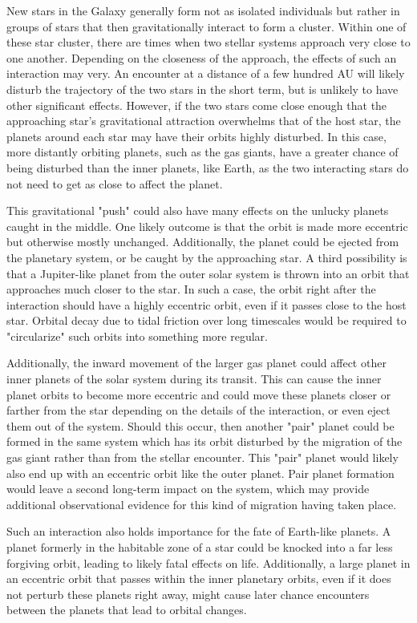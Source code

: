 \documentclass[12pt]{article}
\begin{document}
New stars in the Galaxy generally form not as isolated individuals but rather in groups of stars
that then gravitationally interact to form a cluster.
Within one of these star cluster, there are times when two stellar systems approach very close
to one another. Depending on the closeness of the approach, the effects of such
an interaction may very. An encounter at a distance of a few hundred AU will likely disturb the trajectory
of the two stars in the short term, but is unlikely to have other significant effects. However,
if the two stars come close enough that the approaching star's gravitational attraction
overwhelms that of the host star, the planets around each star may have their orbits
highly disturbed. In this case, more distantly orbiting planets, such as the gas giants,
have a greater chance of being disturbed than the inner planets, like Earth, as the two 
interacting stars do not need to get as close to affect the planet.

This gravitational "push" could also have many effects on the unlucky planets caught in the
middle. One likely outcome is that the orbit is made more eccentric but otherwise
mostly unchanged. Additionally, the planet could be ejected from the planetary system,
or be caught by the approaching star. A third possibility is that a Jupiter-like planet
from the outer solar system is thrown into an orbit that approaches much closer to the
star. In such a case, the orbit right after the interaction should have a highly
eccentric orbit, even if it passes close to the host star. Orbital decay due to tidal
friction over long
timescales would be required to "circularize" such orbits into something more regular.

Additionally, the inward movement of the larger gas planet could affect other
inner planets of the solar system during its transit. This can
cause the inner planet orbits to become more eccentric and could move
these planets closer or farther from the star depending on the details of the
interaction, or even eject them out of the system. Should this occur,
then another "pair" planet could be formed in the same system which has its orbit
disturbed by the migration of the gas giant rather than from the stellar encounter. 
This "pair" planet 
would likely also end up with an eccentric orbit like the outer planet. Pair planet formation would leave
a second long-term impact on the system, which may provide additional observational
evidence for this kind of migration having taken place.

Such an interaction also holds importance for the fate of Earth-like planets.
A planet formerly in the habitable zone of a star could be knocked into a far less
forgiving orbit, leading to likely fatal effects on life. Additionally, a
large planet in an eccentric orbit that passes within the inner planetary orbits,
even if it does not perturb these planets right away, might cause later chance
encounters between the planets that lead to orbital changes.
\end{document}
